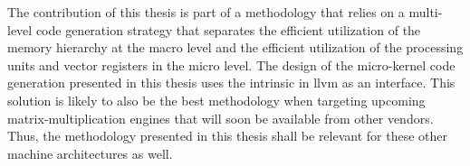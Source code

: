 \documentclass[\main/thesis.tex]{subfiles}
\begin{document}
The contribution of this thesis is part of a methodology that relies on a multi-level code generation strategy that separates the efficient utilization of the memory hierarchy at the macro level and the efficient utilization of the processing units and vector registers in the micro level.
The design of the micro-kernel code generation presented in this thesis uses the  \gls{intrinsic} in \gls{llvm} as an interface.
This solution is likely to also be the best methodology when targeting upcoming matrix-multiplication engines that will soon be available from other vendors.
Thus, the methodology presented in this thesis shall be relevant for these other machine architectures as well.
\end{document}
